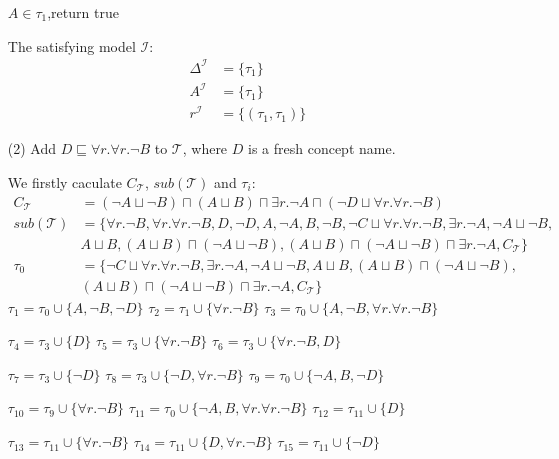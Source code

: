 \documentclass[12pt]{article}
\def \T {\mathcal{T}}
\def \I {\mathcal{I}}
\begin{document}
\begin{enumerate}
    \quad $A \in \tau_1$,\quad return true \par
    The satisfying model $\I$: 
    \begin{align*}
        \Delta^{\I} &= \{\tau_1\} \\
        A^{\I} &= \{\tau_1\} \\
        r^{\I} &= \{(\tau_1,\tau_1)\}
    \end{align*}
        \item [(2)]
        Add $D \sqsubseteq \forall r.\forall r.\neg B$ to $\T$, where $D$ is a fresh concept name. \par
        We firstly caculate $C_{\T}$, $sub(\T)$ and $\tau_i$:
        \begin{align*}
            C_{\T} &= (\neg A \sqcup \neg B)\sqcap (A \sqcup B) \sqcap \exists r.\neg A \sqcap(\neg D \sqcup \forall r.\forall r.\neg B) \\
            sub(\T) &= \{\forall r.\neg B,\forall r.\forall r.\neg B,D,\neg D, A,\neg A,B,\neg B, \neg C \sqcup \forall r.\forall r.\neg B,\exists r.\neg A, \neg A \sqcup \neg B, \\ & A \sqcup B, (A \sqcup B)\sqcap (\neg A \sqcup \neg B), (A \sqcup B)\sqcap (\neg A \sqcup \neg B) \sqcap \exists r.\neg A, C_{\T}\} \\
            \tau_0 &= \{\neg C \sqcup \forall r.\forall r.\neg B,\exists r.\neg A, \neg A \sqcup \neg B, A \sqcup B, (A \sqcup B)\sqcap (\neg A \sqcup \neg B), \\ & (A \sqcup B)\sqcap (\neg A \sqcup \neg B) \sqcap \exists r.\neg A, C_{\T}\}
        \end{align*}
        \qquad $\tau_1 = \tau_0 \cup \{A,\neg B,\neg D\}$ \qquad $\tau_2 = \tau_1 \cup \{\forall r.\neg B\}$ \qquad $\tau_3 = \tau_0 \cup \{A,\neg B,\forall r.\forall r.\neg B\}$

    \qquad $\tau_4 = \tau_3 \cup \{D\}$ \qquad $\tau_5 = \tau_3 \cup \{\forall r.\neg B\}$ \qquad $\tau_6 = \tau_3 \cup \{\forall r.\neg B,D\}$

    \qquad $\tau_7 = \tau_3 \cup \{\neg D\}$ \qquad $\tau_8 = \tau_3 \cup \{\neg D,\forall r.\neg B\}$ \qquad $\tau_9 = \tau_0 \cup \{\neg A, B,\neg D\}$

    \qquad $\tau_{10} = \tau_9 \cup \{\forall r.\neg B\}$ \qquad $\tau_{11} = \tau_0 \cup \{\neg A, B,\forall r.\forall r.\neg B\}$ \qquad $\tau_{12} = \tau_{11} \cup \{D\}$

    \qquad $\tau_{13} = \tau_{11} \cup \{\forall r.\neg B\}$ \qquad $\tau_{14} = \tau_{11} \cup \{D,\forall r.\neg B\}$ \qquad $\tau_{15} = \tau_{11} \cup \{\neg D\}$


\end{enumerate}
\end{document}
